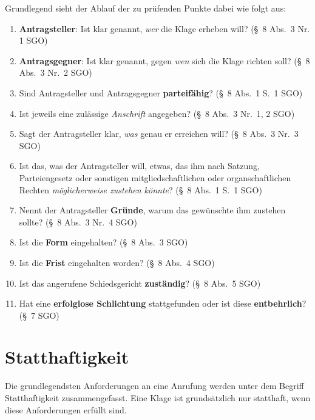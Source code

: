 Grundlegend sieht der Ablauf der zu prüfenden Punkte dabei wie folgt aus:
\begin{enumerate}[label=\Roman*.]
\item \textbf{Antragsteller}: Ist klar genannt, \emph{wer} die Klage erheben will? (\S~8 Abs.~3 Nr. 1 SGO)
\item \textbf{Antragsgegner}: Ist klar genannt, gegen \emph{wen} sich die Klage richten soll? (\S~8 Abs.~3 Nr.~2 SGO)
\item Sind Antragsteller und Antragsgegner \textbf{parteifähig}? (\S~8 Abs.~1 S.~1 SGO)
\item Ist jeweils eine zulässige \emph{Anschrift} angegeben? (\S~8 Abs.~3 Nr.~1, 2 SGO)
\item Sagt der Antragsteller klar, \emph{was} genau er erreichen will? (\S~8 Abs.~3 Nr.~3 SGO)
\item Ist das, was der Antragsteller will, etwas, das ihm nach Satzung, Parteiengesetz oder sonstigen mitgliedschaftlichen oder organschaftlichen Rechten \emph{möglicherweise zustehen könnte}? (\S~8 Abs.~1 S.~1 SGO)
\item Nennt der Antragsteller \textbf{Gründe}, warum das gewünschte ihm zustehen sollte? (\S~8 Abs.~3 Nr.~4 SGO)
\item Ist die \textbf{Form} eingehalten? (\S~8 Abs.~3 SGO)
\item Ist die \textbf{Frist} eingehalten worden? (\S~8 Abs.~4 SGO)
\item Ist das angerufene Schiedsgericht \textbf{zuständig}? (\S~8 Abs.~5 SGO)
\item Hat eine \textbf{erfolglose Schlichtung} stattgefunden oder ist diese \textbf{entbehrlich}? (\S~7 SGO)
\end{enumerate}

\section{Statthaftigkeit}
\label{Anrufung:Statthaftigkeit}
Die grundlegendsten Anforderungen an eine Anrufung werden unter dem Begriff Statthaftigkeit zusammengefasst.
Eine Klage ist grundsätzlich nur statthaft, wenn diese Anforderungen erfüllt sind.

